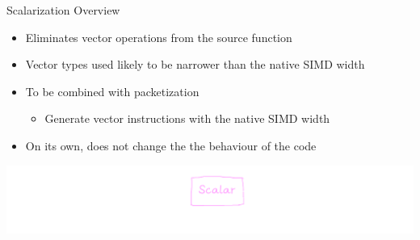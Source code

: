 
\begin{frame}[fragile]{Scalarization Overview}

\begin{itemize}
    \item Eliminates vector operations from the source function
    \item Vector types used likely to be narrower than the native SIMD width
    \item To be combined with packetization
    \begin{itemize}
        \item Generate vector instructions with the native SIMD width
    \end{itemize}
    \item On its own, does not change the the behaviour of the code
\end{itemize}

\vfill
\hspace{1em}\includegraphics[scale=0.55]{images/stages-scalar.pdf}

\end{frame}


